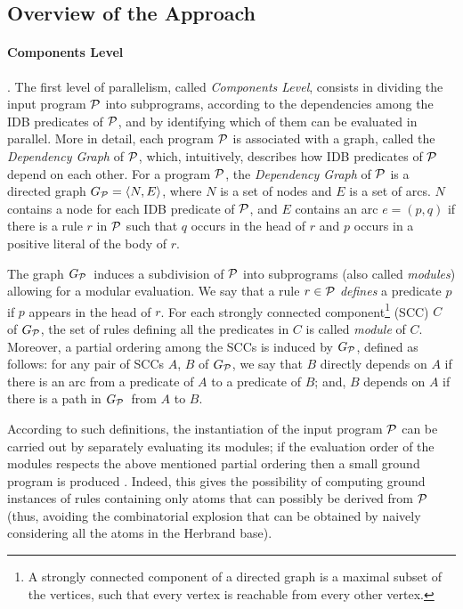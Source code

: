 \documentclass[preprint]{tlp}
\newcommand{\p}{\ensuremath{{\cal P}}\xspace}
\newcommand{\dgp}{\mbox{$G_{\p}$}}
\begin{document}
\subsection{Overview of the Approach}\label{subsec:paroverview}
\paragraph {Components Level}\cite{cali-etal-2008-joacil}.
The first level of parallelism, called {\em Components Level},
consists in dividing the input program \p into subprograms,
according to the dependencies among the IDB predicates of \p, and by
identifying which of them can be evaluated in parallel.
More in detail, each program \p is associated with a graph, called
the {\em Dependency Graph} of \p, which, intuitively, describes how
IDB predicates of \p depend on each other. For a program \p, the
{\em Dependency Graph} of \p is a directed graph $\dgp = \left
\langle N, E \right \rangle $, where $N$ is a set of nodes and $E$
is a set of arcs. $N$ contains a node for each IDB predicate of \p,
and $E$ contains an arc $e = (p, q)$ if there is a rule $r$ in $\p$
such that $q$ occurs in the head of $r$ and $p$ occurs in a positive
literal of the body of $r$.

The graph \dgp\ induces a subdivision of \p into subprograms (also
called {\em modules}) allowing for a modular evaluation. We say that
a rule $r\in \p$ {\em defines} a predicate $p$ if $p$ appears in the
head of $r$. For each strongly connected component\footnote{A
strongly connected component of a directed graph is a maximal subset
of the vertices, such that every vertex is reachable from every
other vertex.}
(SCC) $C$ of \dgp , the set of rules defining all the
predicates in $C$ is called {\em module} of $C$.
Moreover, a partial ordering among the SCCs is induced by \dgp,
defined as follows: for any pair of SCCs $A$, $B$ of \dgp , we say
that $B$ directly depends on $A$ if there is an arc from a predicate
of $A$ to a predicate of $B$; and, $B$ depends on $A$ if there is a
path in \dgp\ from $A$ to $B$.

According to such definitions, the instantiation of the input
program \p can be carried out by separately evaluating its modules;
if the evaluation order of the modules respects the above mentioned
partial ordering then a small ground program is produced \cite{cali-etal-2008-joacil}. Indeed,
this gives the possibility of computing ground instances of rules
containing only atoms that can possibly be derived from \p
(thus, avoiding the combinatorial explosion that can be obtained by
naively considering all the atoms in the Herbrand base).
\end{document}
